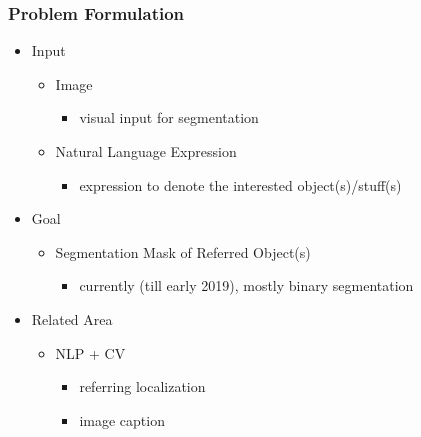 \subsubsection{Problem Formulation}
\begin{itemize}
\item Input
	\begin{itemize}
	\item Image 
		\begin{itemize}
		\item visual input for segmentation
		\end{itemize}
	\item Natural Language Expression
		\begin{itemize}
		\item expression to denote the interested object(s)/stuff(s)
		\end{itemize}
	\end{itemize}
\item Goal
	\begin{itemize}
	\item Segmentation Mask of Referred Object(s)
		\begin{itemize}
		\item currently (till early 2019), mostly binary segmentation
		\end{itemize}
	\end{itemize}
\item Related Area
	\begin{itemize}
	\item NLP + CV
		\begin{itemize}
		\item referring localization
		\item image caption
		\end{itemize}
	\end{itemize}
\end{itemize}

